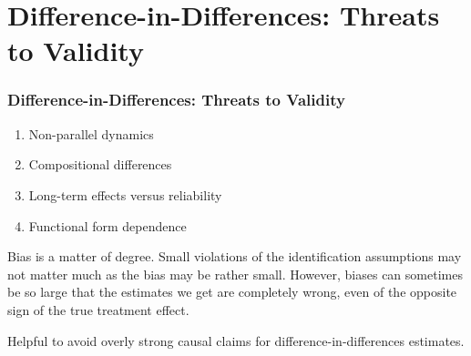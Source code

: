 \documentclass{beamer}
\numberwithin{equation}{section}
\begin{document}
\section{Difference-in-Differences: Threats to Validity}


\begin{frame}
  \frametitle{Difference-in-Differences: Threats to Validity}

\begin{enumerate}
\item Non-parallel dynamics\bigskip
\item Compositional differences\bigskip
\item Long-term effects versus reliability\bigskip
\item Functional form dependence\bigskip
\end{enumerate}
Bias is a matter of degree. Small violations of the identification assumptions may not matter much as the bias may be rather small. However, biases can sometimes be so large that the estimates we get are completely wrong, even of the opposite sign of the true treatment effect.\\\bigskip

Helpful to avoid overly strong causal claims for difference-in-differences estimates.




\end{frame}


\end{document}
